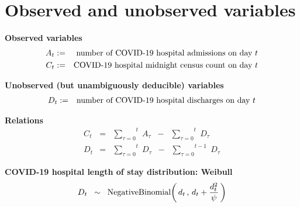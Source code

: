 

\section{Observed and unobserved variables}
\setcounter{theorem}{0}
\setcounter{equation}{0}


\renewcommand{\theenumi}{\roman{enumi}}
\renewcommand{\labelenumi}{\textnormal{(\theenumi)}$\;\;$}


\noindent
\textbf{Observed variables}
\begin{eqnarray*}
A_{t}
& := &
	\textnormal{number of COVID-19 hospital admissions on day $t$} 
\\
C_{t}
& := &
	\textnormal{COVID-19 hospital midnight census count on day $t$} 
\end{eqnarray*}


\vskip 0.5cm
\noindent
\textbf{Unobserved (but unambiguously deducible) variables}
\begin{eqnarray*}
D_{t}
& := &
	\textnormal{number of COVID-19 hospital discharges on day $t$} 
\\
\end{eqnarray*}


\vskip 0.3cm
\noindent
\textbf{Relations}
\begin{eqnarray*}
C_{t}
& = &
	\overset{t}{\underset{\tau=0}{\sum}} \; A_{\tau}
	\;\; - \;\;
	\overset{t}{\underset{\tau=0}{\sum}} \; D_{\tau}
\\
D_{t}
& = &
	\overset{t}{\underset{\tau=0}{\sum}} \; D_{\tau}
	\;\; - \;\;
	\overset{t-1}{\underset{\tau=0}{\sum}} \; D_{\tau}
\end{eqnarray*}


\vskip 0.5cm
\noindent
\textbf{COVID-19 hospital length of stay distribution: Weibull}
\begin{equation*}
D_{t}
\;\; \sim \;\;
	\textnormal{NegativeBinomial}\!\left(\,d_{t}\,,\,d_{t}+\dfrac{d_{t}^{2}}{\psi}\,\right)
\end{equation*}


